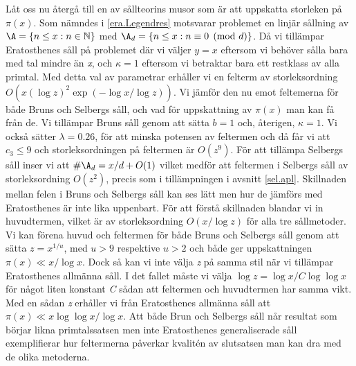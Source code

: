 Låt oss nu återgå till en av sållteorins musor som är att uppskatta storleken på \(\pi(x)\).
Som nämndes i \ref{era.Legendres} motsvarar problemet en linjär sållning av \(\A = \{n\leq x: n\in\mathbb{N}\}\) med \(\A_d = \{n\leq x: n \equiv 0 \pmod{d}\}\). Då vi tillämpar Eratosthenes såll på problemet där vi väljer \(y = x\) eftersom vi behöver sålla bara med tal mindre än \textit{x}, och \(\kappa = 1\) eftersom vi betraktar bara ett restklass av alla primtal. 
Med detta val av parametrar erhåller vi en felterm av storleksordning \(O(x(\log z)^2\exp({-\log x/\log z}))\).
Vi jämför den nu emot feltemerna för både Bruns och Selbergs såll, och vad för uppskattning av \(\pi(x)\) man kan få  från de.
Vi tillämpar Bruns såll genom att sätta \(b = 1\) och, återigen, \(\kappa = 1\). 
Vi också sätter \(\lambda = 0.26\), för att minska potensen av feltermen och då får vi att \(c_3 \leq 9\) och storleksordningen på feltermen är \(O(z^9)\).
För att tillämpa Selbergs såll inser vi att \(\#\A_d = x/d + O(1)\) vilket medför att feltermen i Selbergs såll av storleksordning \(O(z^2)\), precis som i tillämpningen i avsnitt \ref{sel.apl}.
Skillnaden mellan felen i Bruns och Selbergs såll kan ses lätt men hur de jämförs med Eratosthenes är inte lika uppenbart.
För att förstå skillnaden blandar vi in huvudtermen, vilket är av storleksordning \(O(x/\log z)\) för alla tre sållmetoder.
Vi kan förena huvud och feltermen för både Bruns och Selbergs såll genom att sätta \(z = x^{1/u}\), med \(u > 9\) respektive \(u > 2\) och både ger uppskattningen \(\pi(x) \ll x/\log x\). 
Dock så kan vi inte välja \textit{z} på samma stil när vi tillämpar Eratosthenes allmänna såll.
I det fallet måste vi välja \(\log z = \log x/C\log\log x\) för något liten konstant \textit{C} sådan att feltermen och huvudtermen har samma vikt.
Med en sådan \textit{z} erhåller vi från Eratosthenes allmänna såll att \(\pi(x) \ll x\log\log x/\log x\).
Att både Brun och Selbergs såll når resultat som börjar likna primtalssatsen men inte Eratosthenes generaliserade såll  exemplifierar hur feltermerna påverkar kvalitén av slutsatsen man kan dra med de olika metoderna.

